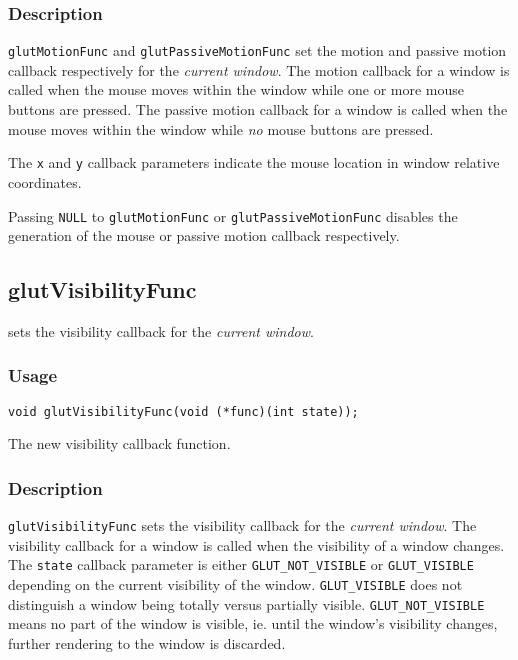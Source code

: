\subsubsection*{Description}

{\tt glutMotionFunc} and {\tt glutPassiveMotionFunc} set the motion and
passive motion callback respectively for the {\em current window}.
The motion callback for a window is called when the mouse moves
within the window while one or more mouse buttons are pressed.  The
passive motion callback for a window is called when the mouse moves
within the window while {\em no} mouse buttons are pressed.

The {\tt x} and {\tt y} callback parameters indicate the mouse location
in window relative coordinates.

Passing {\tt NULL} to {\tt glutMotionFunc} or {\tt glutPassiveMotionFunc}
disables the generation of the mouse or passive motion callback
respectively.

\subsection{glutVisibilityFunc}

 sets the visibility callback for the {\em
current window}.

\subsubsection*{Usage}
\begin{verbatim}
void glutVisibilityFunc(void (*func)(int state));
\end{verbatim}
\begin{description}
\itemsep 0in
\item[\tt func]
The new visibility callback function.
\end{description}

\subsubsection*{Description}

{\tt glutVisibilityFunc} sets the visibility callback for the {\em
current window}.  The visibility callback for a window is called when
the visibility of a window changes.  The {\tt state} callback parameter
is either {\tt GLUT\_NOT\_VISIBLE} or {\tt GLUT\_VISIBLE} depending on
the current visibility of the window.  {\tt GLUT\_VISIBLE} does not
distinguish a window being totally versus partially visible.  {\tt GLUT\_NOT\_VISIBLE}
means no part of the window is visible, ie. until the window's visibility changes,
further rendering to the window is discarded.

